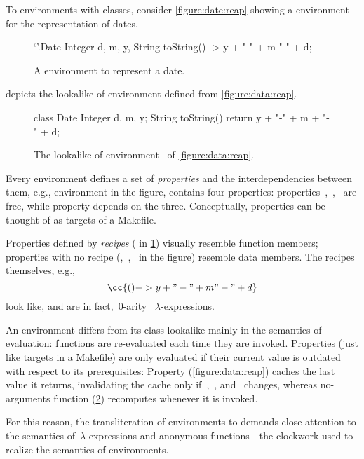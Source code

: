 To environments with classes, consider \cref{figure:date:reap} showing a \Reap
environment for the representation of dates.

\begin{figure}
  \caption{\label{figure:date}%
    A \Reap environment to represent a date.
  }
\begin{reap}
`'.Date {
  Integer d, m, y,
  String toString() -> y + "-" + m "-" + d;
}
\end{reap}
\end{figure}

 depicts the \Java {} lookalike of environment
 defined from \cref{figure:data:reap}.

\begin{figure}
  \caption{\label{figure:date:java}%
The \Java {} lookalike of environment~ of
\cref{figure:data:reap}.
  }
\begin{java}
class Date {
  Integer d, m, y;
  String toString() {
    return y + "-" + m + "-" + d;
  }
}
\end{java}
\end{figure}

Every environment defines a set of \emph{properties} and the interdependencies
between them, e.g., environment  in the figure, contains four
properties: properties~,~,~ are free, while property
 depends on the three. Conceptually, properties can be thought of
as {targets} of a Makefile.

Properties defined by \emph{recipes} ( in \cref{figure:date})
visually resemble function members; properties with no recipe
(,~,~ in the figure) resemble data members.
The recipes themselves, e.g.,
\[
  \cc{() -> y + "-" + m "-" + d}
\]
look like, and are in fact,~$0$-arity \Java~$λ$-expressions.

An environment differs from its class lookalike mainly in the semantics of
evaluation: functions are re-evaluated each time they are invoked. Properties
(just like targets in a Makefile) are only evaluated if their current value is
outdated with respect to its prerequisites: Property 
(\cref{figure:data:reap}) caches the last value it returns, invalidating the
cache only if~,~, and~ changes, whereas no-arguments function
 (\cref{figure:date:java}) recomputes whenever it is invoked.

For this reason, the transliteration of environments to \Java demands close
attention to the semantics of~$λ$-expressions and anonymous functions---the
\Java clockwork used to realize the semantics of environments.

